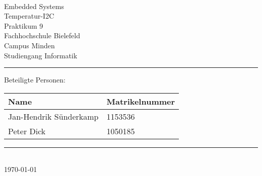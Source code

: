 \begin{titlepage}
   \mbox{}\vspace{5\baselineskip}\\
   \sffamily\huge
   \centering
   {\Huge Embedded Systems} \\
   Temperatur-I2C\\
    \normalsize Praktikum 9
   \vspace{3\baselineskip}\\
   \rmfamily\Large
  Fachhochschule Bielefeld \\
  Campus Minden \\
  Studiengang Informatik
   \vspace{2\baselineskip}\\
\noindent\rule{15cm}{0.4pt}
Beteiligte Personen:
\begin{table}[H]
	\tablestyle
	\begin{tabular}{*{2}{v{0.45\textwidth}}}
		\hline
		\textbf{Name} & \textbf{Matrikelnummer}
		\tabularnewline
		\hline
		Jan-Hendrik Sünderkamp & 1153536\tabularnewline
		Peter Dick & 1050185\tabularnewline
	\end{tabular}
\end{table}

   \noindent\rule{15cm}{0.4pt}
      \vspace{1\baselineskip}\\
   \today
\end{titlepage}

